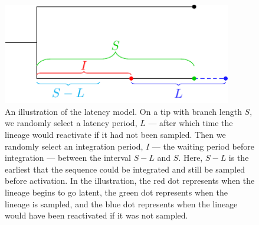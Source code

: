 \documentclass[12pt]{article}
\begin{document}
\begin{figure}[ht]
	\centering{}
	\includegraphics[width=10cm]{figures/latency-model}
	\caption[Latency Model]{
	An illustration of the latency model.
	On a tip with branch length $S$, we randomly select a latency period, $L$ --- after which time the lineage would reactivate if it had not been sampled.
	Then we randomly select an integration period, $I$ --- the waiting period before integration --- between the interval $S-L$ and $S$.
	Here, $S-L$ is the earliest that the sequence could be integrated and still be sampled before activation.
	In the illustration, the red dot represents when the lineage begins to go latent, the green dot represents when the lineage is sampled, and the blue dot represents when the lineage would have been reactivated if it was not sampled.
	}
	\label{fig:latencymodel}
\end{figure}
\end{document}
